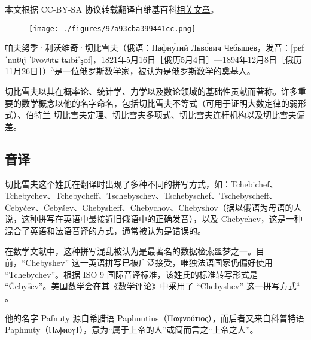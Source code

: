 
本文根据 CC-BY-SA 协议转载翻译自维基百科\href{https://en.wikipedia.org/wiki/Pafnuty_Chebyshev}{相关文章}。

\begin{figure}[ht]
\centering
\texttt{[image: ./figures/97a93cba399441cc.png]}
\caption{} \label{fig_PFNJ_1}
\end{figure}
帕夫努季·利沃维奇·切比雪夫（俄语：Пафну́тий Льво́вич Чебышёв，发音：[pɐfˈnutʲɪj ˈlʲvovʲɪtɕ tɕɪbɨˈʂof]，1821年5月16日［俄历5月4日］—1894年12月8日［俄历11月26日］）\(^\text{3}\)是一位俄罗斯数学家，被认为是俄罗斯数学的奠基人。

切比雪夫以其在概率论、统计学、力学以及数论领域的基础性贡献而著称。许多重要的数学概念以他的名字命名，包括切比雪夫不等式（可用于证明大数定律的弱形式）、伯特兰-切比雪夫定理、切比雪夫多项式、切比雪夫连杆机构以及切比雪夫偏差。
\subsection{音译}
切比雪夫这个姓氏在翻译时出现了多种不同的拼写方式，如：Tchebichef、Tchebychev、Tchebycheff、Tschebyschev、Tschebyschef、Tschebyscheff、Čebyčev、Čebyšev、Chebysheff、Chebychov、Chebyshov（据以俄语为母语的人说，这种拼写在英语中最接近旧俄语中的正确发音），以及 Chebychev，这是一种混合了英语和法语音译的方式，通常被认为是错误的。

在数学文献中，这种拼写混乱被认为是最著名的数据检索噩梦之一。目前，“Chebyshev” 这一英语拼写已被广泛接受，唯独法语国家仍偏好使用 “Tchebychev”。根据 ISO 9 国际音译标准，该姓氏的标准转写形式是 “Čebyšëv”。美国数学会在其《数学评论》中采用了 “Chebyshev” 这一拼写方式\(^\text{4}\)。

他的名字 Pafnuty 源自希腊语 Paphnutius（Παφνούτιος），而后者又来自科普特语 Paphnuty（Ⲡⲁⲫⲛⲟⲩϯ），意为“属于上帝的人”或简而言之“上帝之人”。
